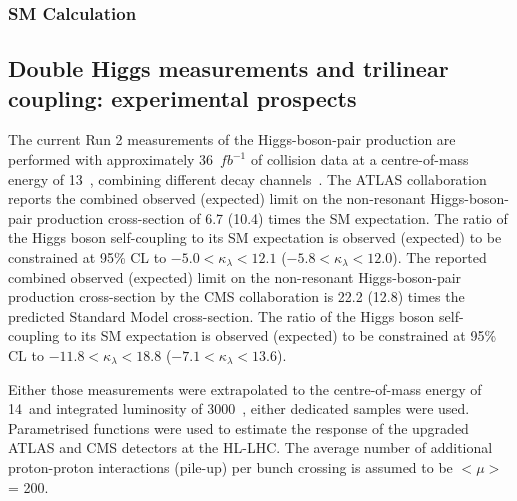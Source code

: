 \documentclass[../report.tex]{subfiles}
\begin{document}
\subsubsection{SM Calculation}












\subsection{Double Higgs measurements and trilinear coupling: experimental prospects}
\label{sec:HH_meas_exp}

The current Run 2 measurements of the Higgs-boson-pair production are performed with approximately 36~$fb^{-1}$ of collision data at a centre-of-mass energy of 13~\UTeV, combining different decay channels~\cite{ATLAS-CONF-2018-043, Sirunyan:2018two}. 
The ATLAS collaboration reports the combined observed (expected) limit on the non-resonant Higgs-boson-pair production cross-section of 6.7 (10.4) times the SM expectation. The ratio of the Higgs boson self-coupling to its SM expectation is observed (expected) to be constrained at 95\% CL to $-5.0<\kappa_{\lambda}<12.1$ ($-5.8<\kappa_{\lambda}<12.0$). 
The reported combined observed (expected) limit on the non-resonant Higgs-boson-pair production cross-section by the CMS collaboration is 22.2 (12.8) times the predicted Standard Model cross-section. The ratio of the Higgs boson self-coupling to its SM expectation is observed (expected) to be constrained at 95\% CL to $-11.8<\kappa_{\lambda}<18.8$ ($-7.1<\kappa_{\lambda}<13.6$). 

Either those measurements were extrapolated to the centre-of-mass energy of 14~\UTeV and integrated luminosity of 3000~\ifb, either dedicated samples were used. Parametrised functions were used to estimate the response of the upgraded ATLAS and CMS detectors at the HL-LHC. The average number of additional proton-proton interactions (pile-up) per bunch crossing is assumed to be $<\mu>$ = 200.
\end{document}
